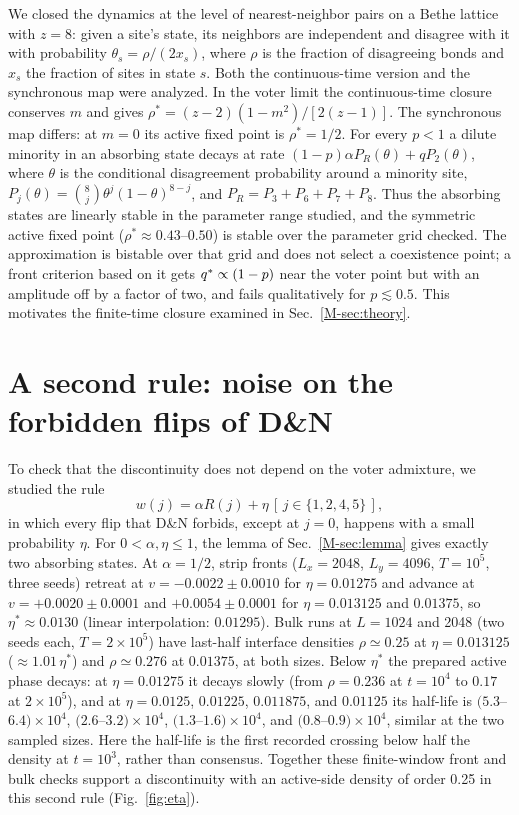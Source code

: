 We closed the dynamics at the level of nearest-neighbor pairs on a Bethe lattice with $z = 8$:
given a site's state, its neighbors are independent and disagree with it with probability
$\theta_s = \rho/(2x_s)$, where $\rho$ is the fraction of disagreeing bonds and $x_s$ the fraction
of sites in state $s$. Both the continuous-time version and the synchronous map were analyzed.
In the voter limit the continuous-time closure conserves $m$ and gives $\rho^*=(z-2)(1-m^2)/[2(z-1)]$. The synchronous map differs: at $m=0$ its active fixed point is $\rho^*=1/2$. For every
$p<1$ a dilute minority in an absorbing state decays at rate
$(1-p)\alpha P_R(\theta) + qP_2(\theta)$, where $\theta$ is the conditional
disagreement probability around a minority site,
$P_j(\theta)=\binom{8}{j}\theta^j(1-\theta)^{8-j}$, and
$P_R=P_3+P_6+P_7+P_8$. Thus the absorbing states are linearly stable in the
parameter range studied, and the
symmetric active fixed point ($\rho^*\approx 0.43$--$0.50$) is stable over the
parameter grid checked. The approximation is bistable over that grid and
does not select a coexistence point; a
front criterion based on it gets $q^{*}\propto(1-p)$ near the voter point but with an amplitude off
by a factor of two, and fails qualitatively for $p\lesssim 0.5$. This motivates the finite-time closure examined in Sec.~\ref{M-sec:theory}.

\section{A second rule: noise on the forbidden flips of D\&N}
\label{app:eta}

To check that the discontinuity does not depend on the voter admixture, we studied the rule
\begin{equation}
w(j) = \alpha R(j) + \eta\,[\,j\in\{1,2,4,5\}\,],
\label{eq:eta}
\end{equation}
in which every flip that D\&N forbids, except at $j = 0$, happens with a small probability $\eta$.
For $0<\alpha,\eta\le1$, the lemma of Sec.~\ref{M-sec:lemma} gives exactly
two absorbing states. At $\alpha = 1/2$, strip
fronts ($L_x = 2048$, $L_y = 4096$, $T = 10^5$, three seeds) retreat at $v = -0.0022\pm0.0010$ for
$\eta = 0.01275$ and advance at $v = +0.0020\pm0.0001$ and $+0.0054\pm0.0001$ for $\eta = 0.013125$
and $0.01375$, so $\eta^*\approx 0.0130$ (linear interpolation: $0.01295$). Bulk runs at $L = 1024$ and 2048 (two seeds each,
$T = 2\times10^5$) have last-half interface densities
$\rho\simeq0.25$ at $\eta = 0.013125$ ($\approx
1.01\,\eta^*$) and $\rho\simeq0.276$ at $0.01375$, at both sizes. Below $\eta^*$ the prepared active phase decays: at $\eta = 0.01275$ it decays slowly (from $\rho = 0.236$ at $t = 10^4$ to $0.17$ at
$2\times10^5$), and at $\eta = 0.0125$, $0.01225$, $0.011875$, and $0.01125$ its half-life is
$(5.3$--$6.4)\times10^4$, $(2.6$--$3.2)\times10^4$, $(1.3$--$1.6)\times10^4$, and $(0.8$--$0.9)
\times10^4$, similar at the two sampled sizes. Here the half-life is the first
recorded crossing below half the density at $t=10^3$, rather than consensus.
Together these finite-window front and bulk checks support a discontinuity
with an active-side density of order 0.25 in this second rule
(Fig.~\ref{fig:eta}).

